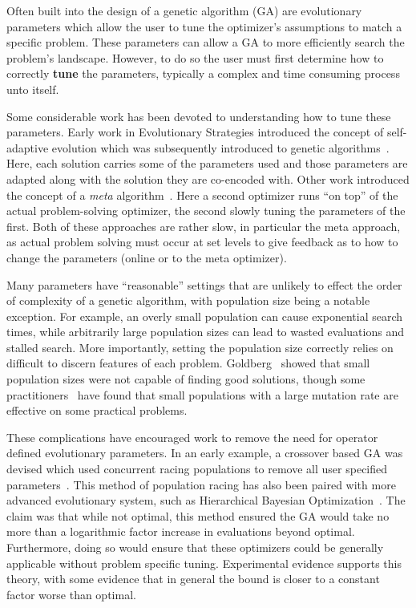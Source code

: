 \documentclass{sig-alternate}
\begin{document}
Often built into the design of a genetic algorithm (GA) are
evolutionary parameters which allow the user to tune the optimizer's
assumptions to match a specific problem.  These parameters can allow
a GA to more efficiently search the problem's landscape.  However, to
do so the user must first determine how to correctly \textbf{tune} the
parameters, typically a complex and time consuming process unto
itself.

Some considerable work has been devoted to understanding how to tune
these parameters. Early work in Evolutionary Strategies introduced the
concept of self-adaptive evolution which was subsequently introduced
to genetic algorithms~\cite{Back:1992:selfadapt}. Here, each solution
carries some of the parameters used and those parameters are adapted
along with the solution they are co-encoded with. Other work introduced the concept
of a \emph{meta} algorithm~\cite{grefenstette:1986:optimalga}. Here a
second optimizer runs ``on top'' of the actual problem-solving
optimizer, the second slowly tuning the parameters of the first. Both
of these approaches are rather slow, in particular the meta
approach, as actual problem solving must occur at set levels to give
feedback as to how to change the parameters (online or to the meta
optimizer). 

Many parameters have ``reasonable'' settings that are
unlikely to effect the order of complexity of a genetic algorithm,
with population size being a notable exception. For example, an overly small
population can cause exponential search times, while arbitrarily large
population sizes can lead to wasted evaluations and stalled search.
More importantly, setting the population size correctly relies on
difficult to discern features of each problem. 
Goldberg~\cite{goldberg:1991:gasize} showed that small
population sizes were not capable of finding good solutions, though
some practitioners~\cite{haupt:2000:optimum} have found that small
populations with a large mutation rate are effective on some practical
problems.

These complications have encouraged work to remove the need for
operator defined evolutionary parameters. In
an early example, a crossover based GA was devised which used
concurrent racing populations to remove all user specified
parameters~\cite{harik:1999:parameterlessga}.  This method of
population racing has also been paired with more advanced evolutionary
system, such as Hierarchical Bayesian
Optimization~\cite{pelikan:2004:parameterlesshboa}. The claim was that
while not optimal, this method ensured the GA would take no more than
a logarithmic factor increase in evaluations beyond optimal.  Furthermore, doing so would
ensure that these optimizers could be generally applicable without
problem specific tuning.  Experimental evidence supports this theory,
with some evidence that in general the bound is closer to a constant
factor worse than optimal.
\end{document}
